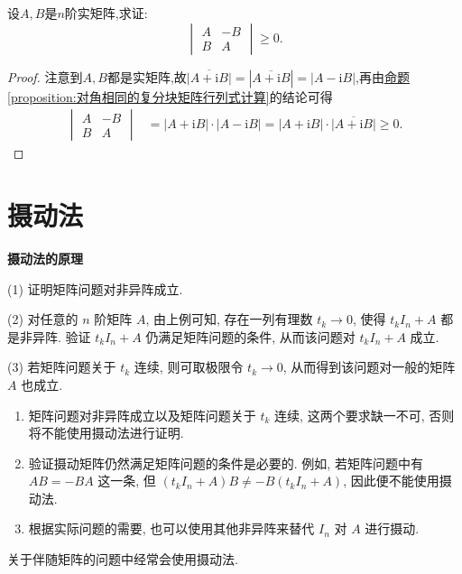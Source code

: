 \documentclass[lang=cn,newtx,10pt,scheme=chinese]{elegantbook}
\begin{document}
\begin{example}
设\(A,B\)是\(n\)阶实矩阵,求证:
\[
\begin{vmatrix}
A & -B\\
B & A
\end{vmatrix}\geq0.
\]
\end{example}
\begin{proof}
注意到\(A,B\)都是实矩阵,故\(\overline{|A + \mathrm{i}B|}=|\overline{A + \mathrm{i}B}|=|A - \mathrm{i}B|\),再由\hyperref[proposition:对角相同的复分块矩阵行列式计算]{命题\ref{proposition:对角相同的复分块矩阵行列式计算}}的结论可得
\begin{align*}
\begin{vmatrix}
A & -B\\
B & A
\end{vmatrix}&=|A + \mathrm{i}B|\cdot|A - \mathrm{i}B|=|A + \mathrm{i}B|\cdot\overline{|A + \mathrm{i}B|}\geq0.
\end{align*}
\end{proof}

\section{摄动法}
\textbf{摄动法的原理}

(1) 证明矩阵问题对非异阵成立.

(2) 对任意的 \(n\) 阶矩阵 \(A\), 由上例可知, 存在一列有理数 \(t_k\rightarrow0\), 使得 \(t_kI_n + A\) 都是非异阵. 验证 \(t_kI_n + A\) 仍满足矩阵问题的条件, 从而该问题对 \(t_kI_n + A\) 成立.

(3) 若矩阵问题关于 \(t_k\) 连续, 则可取极限令 \(t_k\rightarrow0\), 从而得到该问题对一般的矩阵 \(A\) 也成立.

\begin{remark}
\begin{enumerate}
\item 矩阵问题对非异阵成立以及矩阵问题关于 \(t_k\) 连续, 这两个要求缺一不可, 否则将不能使用摄动法进行证明.
\item 验证摄动矩阵仍然满足矩阵问题的条件是必要的. 例如, 若矩阵问题中有 \(AB=-BA\) 这一条, 但 \((t_kI_n + A)B\neq -B(t_kI_n + A)\), 因此便不能使用摄动法.
\item 根据实际问题的需要, 也可以使用其他非异阵来替代 \(I_n\) 对 \(A\) 进行摄动.
\end{enumerate}
\end{remark}
\begin{note}
关于伴随矩阵的问题中经常会使用摄动法.
\end{note}
\end{document}
